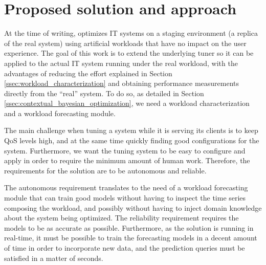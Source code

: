 \documentclass[a4paper, 12pt]{article} %
\begin{document}
	\section{Proposed solution and approach } \label{sec:proposed_solution}
	At the time of writing, \cite{AkamasCGP} optimizes IT systems on a staging environment (a replica of the real system) using artificial workloads that have no impact on the user experience. The goal of this work is to extend the underlying tuner so it can be applied to the actual IT system running under the real workload, with the advantages of reducing the effort explained in Section \ref{ssec:workload_characterization} and obtaining performance measurements directly from the ``real'' system. To do so, as detailed in Section \ref{ssec:contextual_bayesian_optimization}, we need a workload characterization and a workload forecasting module.
	
	The main challenge when tuning a system while it is serving its clients is to keep QoS levels high, and at the same time quickly finding good configurations for the system. Furthermore, we want the tuning system to be easy to configure and apply in order to require the minimum amount of human work. Therefore, the requirements for the solution are to be autonomous and reliable.
	
	The autonomous requirement translates to the need of a workload forecasting module that can train good models without having to inspect the time series composing the workload, and possibly without having to inject domain knowledge about the system being optimized. The reliability requirement requires the models to be as accurate as possible. Furthermore, as the solution is running in real-time, it must be possible to train the forecasting models in a decent amount of time in order to incorporate new data, and the prediction queries must be satisfied in a matter of seconds.
	
\end{document}
